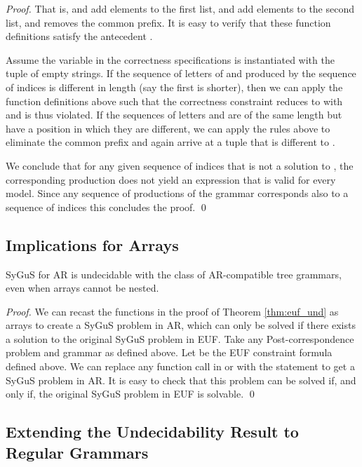 \begin{proof}
That is,  and  add elements to the first list,  and  add elements to the second list, and  removes the common prefix. 
It is easy to verify that these function definitions satisfy the antecedent .

Assume the variable  in the correctness specifications is instantiated with the tuple  of empty strings. 
If the sequence of letters of  and  produced by the sequence of indices is different in length (say the first is shorter), then we can apply the function definitions above such that the correctness constraint reduces to  with  and is thus violated. 
If the sequences of letters  and  are of the same length but have a position in which they are different, we can apply the rules above to eliminate the common prefix and again arrive at a tuple that is different to .

We conclude that for any given sequence of indices that is not a solution to , the corresponding production does not yield an expression that is valid for every model. 
Since any sequence of productions of the grammar corresponds also to a sequence of indices this concludes the proof. 
\qed
\end{proof}





\subsection{Implications for Arrays}


\begin{corollary}
     SyGuS for AR is undecidable with the class of AR-compatible tree grammars, even when arrays cannot be nested. 
    \label{cor:arr_und}
\end{corollary}
\begin{proof}
We can recast the functions in the proof of Theorem \ref{thm:euf_und} as arrays to create a SyGuS problem in AR, which can only be solved if there exists a solution to the original SyGuS problem in EUF.
Take any Post-correspondence problem  and grammar  as defined above.
Let  be the EUF constraint formula defined above. 
We can replace any function call  in  or  with the statement  to get a SyGuS problem in AR.
It is easy to check that this problem can be solved if, and only if, the original SyGuS problem in EUF is solvable.
\qed
\end{proof}

\subsection{Extending the Undecidability Result to Regular Grammars}

